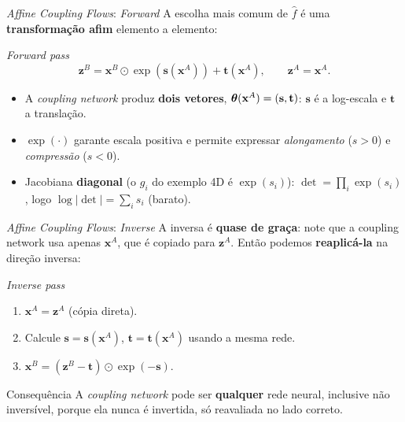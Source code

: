 \documentclass[aspectratio=169,xcolor=dvipsnames]{beamer}
\begin{document}
  \begin{frame}{\textit{Affine Coupling Flows}: \textit{Forward}}
    A escolha mais comum de $\hat{f}$ é uma \textbf{transformação afim}
    elemento a elemento:
    \vspace{0.4em}
    \begin{block}{\textit{Forward pass}}
      \[
        \mathbf{z}^{B} =
        \mathbf{x}^{B} \odot \exp\!\left(\mathbf{s}(\mathbf{x}^{A})\right)
        + \mathbf{t}(\mathbf{x}^{A}),
        \qquad
        \mathbf{z}^{A} = \mathbf{x}^{A}.
      \]
    \end{block}
    \vspace{0.3em}
    \begin{itemize}
      \item A \emph{coupling network} produz \textbf{dois vetores},
      $\bm{\theta}(\mathbf{x}^{A}) = (\mathbf{s}, \mathbf{t})$: $\mathbf{s}$ é a
      log-escala e $\mathbf{t}$ a translação.
      \item $\exp(\cdot)$ garante escala positiva e permite expressar
      \emph{alongamento} ($s > 0$) e \emph{compressão} ($s < 0$).
      \item Jacobiana \textbf{diagonal} (o $g_i$ do exemplo 4D é $\exp(s_i)$):
      $\det = \prod_i \exp(s_i)$, logo
      $\log|\det| = \sum_i s_i$ (barato).
    \end{itemize}
  \end{frame}

  \begin{frame}{\textit{Affine Coupling Flows}: \textit{Inverse}}
    A inversa é \textbf{quase de graça}: note que a coupling network
    usa apenas $\mathbf{x}^{A}$, que é copiado para $\mathbf{z}^{A}$.
    Então podemos \textbf{reaplicá-la} na direção inversa:
    \vspace{0.4em}
    \begin{block}{\textit{Inverse pass}}
      \begin{enumerate}
        \item $\mathbf{x}^{A} = \mathbf{z}^{A}$ (cópia direta).
        \item Calcule $\mathbf{s} = \mathbf{s}(\mathbf{x}^{A})$,
        $\mathbf{t} = \mathbf{t}(\mathbf{x}^{A})$ usando a mesma rede.
        \item $\mathbf{x}^{B} = (\mathbf{z}^{B} - \mathbf{t}) \odot
        \exp(-\mathbf{s})$.
      \end{enumerate}
    \end{block}
    \vspace{0.3em}
    \begin{alertblock}{Consequência}
      A \textit{coupling network} pode ser \textbf{qualquer} rede neural,
      inclusive não inversível, porque ela nunca é invertida,
      só reavaliada no lado correto.
    \end{alertblock}
  \end{frame}
\end{document}
